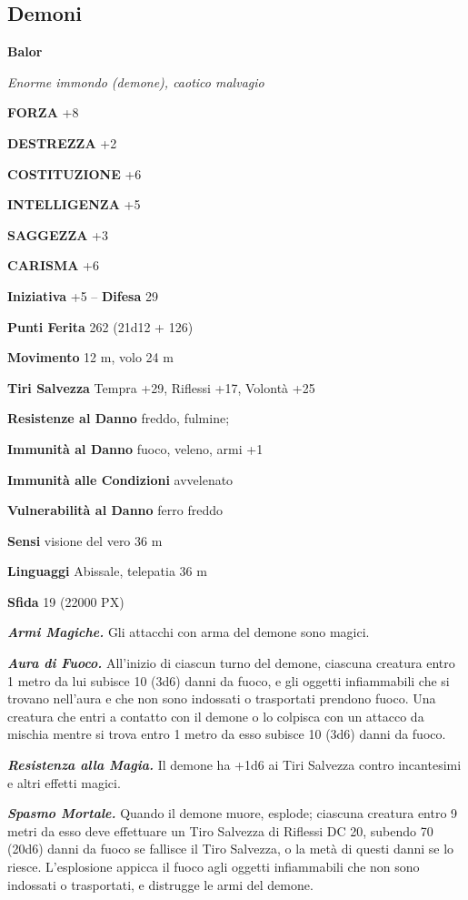 \begin{multicols}{2}
	\subsection{Demoni}

	\medskip{}\textbf{Balor}

	\textit{Enorme immondo (demone), caotico malvagio}

	\textbf{FORZA} +8

	\textbf{DESTREZZA} +2

	\textbf{COSTITUZIONE} +6

	\textbf{INTELLIGENZA} +5

	\textbf{SAGGEZZA} +3

	\textbf{CARISMA} +6

	\textbf{Iniziativa} +5 -- \textbf{Difesa} 29

	\textbf{Punti Ferita} 262 (21d12 + 126)

	\textbf{Movimento} 12 m, volo 24 m

	\textbf{Tiri Salvezza} Tempra +29, Riflessi +17, Volontà +25

	\textbf{Resistenze al Danno} freddo, fulmine;

	\textbf{Immunità al Danno} fuoco, veleno, armi +1

	\textbf{Immunità alle Condizioni} avvelenato

	\textbf{Vulnerabilità al Danno} ferro freddo

	\textbf{Sensi} visione del vero 36 m

	\textbf{Linguaggi} Abissale, telepatia 36 m

	\textbf{Sfida} 19 (22000 PX)

	\textit{\textbf{Armi Magiche.}} Gli attacchi con arma del demone sono magici.

	\textit{\textbf{Aura di Fuoco.}} All'inizio di ciascun turno del demone, ciascuna creatura entro 1 metro da lui subisce 10 (3d6) danni da fuoco, e gli oggetti infiammabili che si trovano nell'aura e che non sono indossati o trasportati prendono fuoco. Una creatura che entri a contatto con il demone o lo colpisca con un attacco da mischia mentre si trova entro 1 metro da esso subisce 10 (3d6) danni da fuoco.

	\textit{\textbf{Resistenza alla Magia.}} Il demone ha +1d6 ai Tiri Salvezza contro incantesimi e altri effetti magici.

	\textit{\textbf{Spasmo Mortale.}} Quando il demone muore, esplode; ciascuna creatura entro 9 metri da esso deve effettuare un Tiro Salvezza di Riflessi DC 20, subendo 70 (20d6) danni da fuoco se fallisce il Tiro Salvezza, o la metà di questi danni se lo riesce. L'esplosione appicca il fuoco agli oggetti infiammabili che non sono indossati o trasportati, e distrugge le armi del demone.


\end{multicols}
